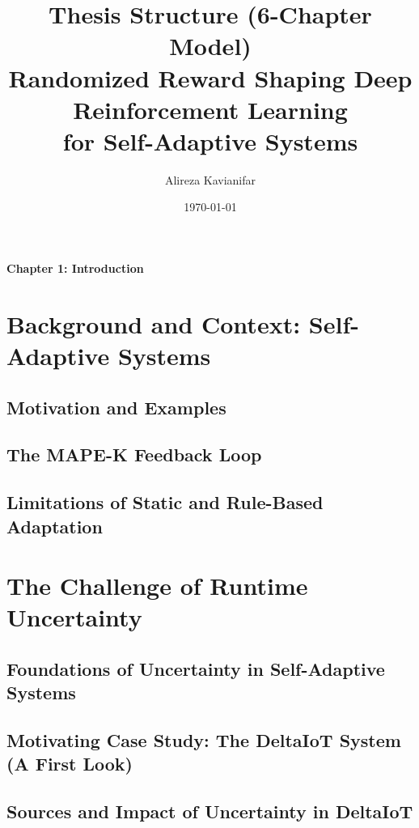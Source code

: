 \documentclass[11pt,a4paper]{article}
\title{Thesis Structure (6-Chapter Model)\\[0.3cm]\small{Randomized Reward Shaping Deep Reinforcement Learning\\for Self-Adaptive Systems}}
\author{Alireza Kavianifar}
\date{\today}
\begin{document}
\maketitle

\tableofcontents
\newpage

\vspace*{1cm}
{\centering \huge \textbf{Chapter 1: Introduction} \par}
\vspace{1cm}

\setcounter{section}{0}
\renewcommand{\thesection}{1.\arabic{section}}
\renewcommand{\thesubsection}{1.\arabic{section}.\arabic{subsection}}

\section{Background and Context: Self-Adaptive Systems}
\subsection{Motivation and Examples}
\subsection{The MAPE-K Feedback Loop}
\subsection{Limitations of Static and Rule-Based Adaptation}

\section{The Challenge of Runtime Uncertainty}
\subsection{Foundations of Uncertainty in Self-Adaptive Systems}
\subsection{Motivating Case Study: The DeltaIoT System (A First Look)}
\subsection{Sources and Impact of Uncertainty in DeltaIoT}
\end{document}
